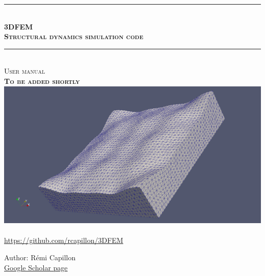 \documentclass[12pt, openany]{report}
\newcommand{\HRule}{\rule{\linewidth}{0.5mm}}
\begin{document}
\begin{titlepage}
  \begin{sffamily}
  \begin{center}
    \HRule \\[0.4cm]
    { \huge \bfseries \textsc{3DFEM\\Structural dynamics simulation code}\\[0.4cm] }
    \HRule \\[0.5cm]
    
    \textsc{\Large User manual}\\[1cm]
    
    \textsc{\Large \bfseries To be added shortly}\\[1.8cm]
    
    \includegraphics[scale=0.2]{3DFEM_image1.png}~\\[3cm]

    {\large \url{https://github.com/rcapillon/3DFEM}}\\[2cm]

    \begin{center}
    	\small Author: Rémi Capillon\\
    	\small \href{https://scholar.google.com/citations?user=q0jsk88AAAAJ}{Google Scholar page}\\
    \end{center}

    \vfill

    
  \end{center}
  \end{sffamily}
\end{titlepage}


\end{document}
